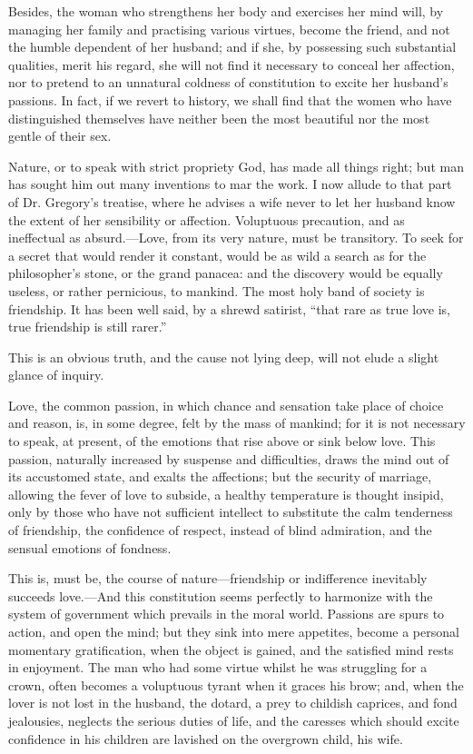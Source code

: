 Besides, the woman who strengthens her body and exercises her mind
will, by managing her family and practising various virtues, become
the friend, and not the humble dependent of her husband; and if she,
by possessing such substantial qualities, merit his regard, she will
not find it necessary to conceal her affection, nor to pretend to an
unnatural coldness of constitution to excite her husband's passions.
In fact, if we revert to history, we shall find that the women who
have distinguished themselves have neither been the most beautiful nor
the most gentle of their sex.

Nature, or to speak with strict propriety God, has made all things
right; but man has sought him out many inventions to mar the work. I
now allude to that part of Dr. Gregory's treatise, where he advises a
wife never to let her husband know the extent of her sensibility or
affection. Voluptuous precaution, and as ineffectual as
absurd.---Love, from its very nature, must be transitory. To 
seek for a secret that would render it constant, would be as wild a
search as for the philosopher's stone, or the grand panacea: and the
discovery would be equally useless, or rather pernicious, to mankind.
The most holy band of society is friendship. It has been well said, by
a shrewd satirist, ``that rare as true love is, true friendship is
still rarer.''

This is an obvious truth, and the cause not lying deep, will not elude
a slight glance of inquiry.

Love, the common passion, in which chance and sensation take place of
choice and reason, is, in some degree, felt by the mass of mankind;
for it is not necessary to speak, at present, of the emotions that
rise above or sink below love. This passion, naturally increased by
suspense and difficulties, draws the mind out of its accustomed state,
and exalts the affections; but the security of marriage, allowing the
fever of love to subside, a healthy temperature is thought insipid,
only by those who have not sufficient intellect to substitute the calm
tenderness of friendship, the confidence of respect, instead of blind
admiration, and the sensual emotions of fondness.

This is, must be, the course of nature---friendship or
indifference inevitably succeeds love.---And this constitution seems
perfectly to harmonize with the system of government which prevails in
the moral world. Passions are spurs to action, and open the mind; but
they sink into mere appetites, become a personal momentary
gratification, when the object is gained, and the satisfied mind rests
in enjoyment. The man who had some virtue whilst he was struggling for
a crown, often becomes a voluptuous tyrant when it graces his brow;
and, when the lover is not lost in the husband, the dotard, a prey to
childish caprices, and fond jealousies, neglects the serious duties of
life, and the caresses which should excite confidence in his children
are lavished on the overgrown child, his wife.

